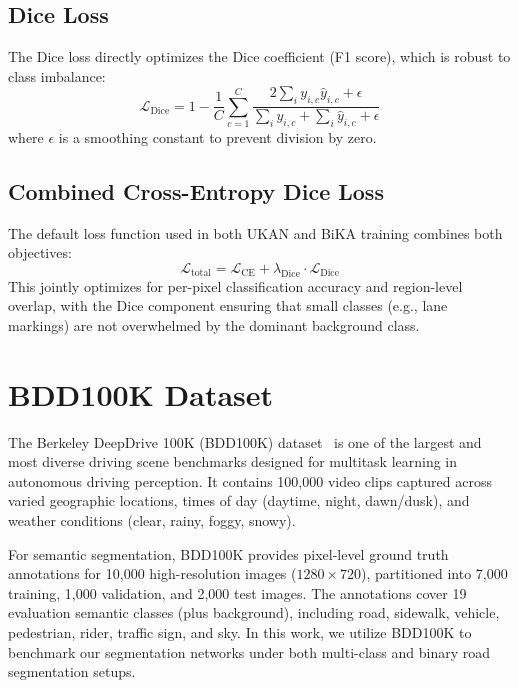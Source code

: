 \documentclass[a4paper]{report}
\begin{document}
\subsection{Dice Loss}
The Dice loss directly optimizes the Dice coefficient (F1 score), which is robust to class imbalance:
\begin{equation}
    \mathcal{L}_{\text{Dice}} = 1 - \frac{1}{C} \sum_{c=1}^{C} \frac{2 \sum_i y_{i,c} \hat{y}_{i,c} + \epsilon}{\sum_i y_{i,c} + \sum_i \hat{y}_{i,c} + \epsilon}
\end{equation}
where $\epsilon$ is a smoothing constant to prevent division by zero.

\subsection{Combined Cross-Entropy Dice Loss}
The default loss function used in both UKAN and BiKA training combines both objectives:
\begin{equation}
    \mathcal{L}_{\text{total}} = \mathcal{L}_{\text{CE}} + \lambda_{\text{Dice}} \cdot \mathcal{L}_{\text{Dice}}
\end{equation}
This jointly optimizes for per-pixel classification accuracy and region-level overlap, with the Dice component ensuring that small classes (e.g., lane markings) are not overwhelmed by the dominant background class.



\section{BDD100K Dataset}
\label{sec:bdd100k}
The Berkeley DeepDrive 100K (BDD100K) dataset~\cite{bdd100k2020} is one of the largest and most diverse driving scene benchmarks designed for multitask learning in autonomous driving perception. It contains 100,000 video clips captured across varied geographic locations, times of day (daytime, night, dawn/dusk), and weather conditions (clear, rainy, foggy, snowy).

For semantic segmentation, BDD100K provides pixel-level ground truth annotations for 10,000 high-resolution images ($1280 \times 720$), partitioned into 7,000 training, 1,000 validation, and 2,000 test images. The annotations cover 19 evaluation semantic classes (plus background), including road, sidewalk, vehicle, pedestrian, rider, traffic sign, and sky. In this work, we utilize BDD100K to benchmark our segmentation networks under both multi-class and binary road segmentation setups.
\end{document}
